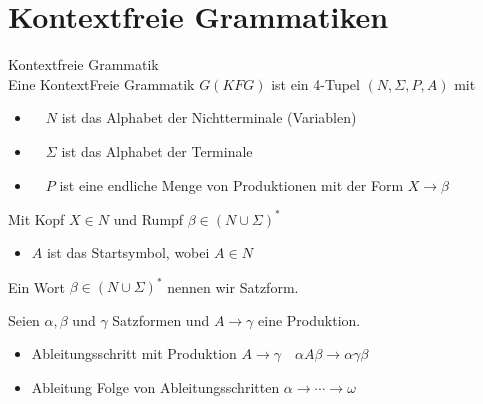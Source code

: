 \graphicspath{{images/}}
\section*{Kontextfreie Grammatiken}

\begin{definition}{Kontextfreie Grammatik}\\
    Eine KontextFreie Grammatik $G(K F G)$ ist ein 4-Tupel $(N, \Sigma, P, A)$ mit

    \begin{itemize}
    \item $\quad N$ ist das Alphabet der Nichtterminale (Variablen)
    \item $\quad \Sigma$ ist das Alphabet der Terminale
    \item $\quad P$ ist eine endliche Menge von Produktionen mit der Form $X \rightarrow \beta$
    \end{itemize}

    Mit Kopf $X \in N$ und Rumpf $\beta \in(N \cup \Sigma)^{*}$

    \begin{itemize}
    \item $A$ ist das Startsymbol, wobei $A \in N$
    \end{itemize}

    Ein Wort $\beta \in(N \cup \Sigma)^{*}$ nennen wir Satzform.

    Seien $\alpha, \beta$ und $\gamma$ Satzformen und $A \rightarrow \gamma$ eine Produktion.

    \begin{itemize}
    \item Ableitungsschritt mit Produktion $A \rightarrow \gamma \quad \alpha A \beta \rightarrow \alpha \gamma \beta$
    \item Ableitung Folge von Ableitungsschritten $\alpha \rightarrow \cdots \rightarrow \omega$
    \end{itemize}
\end{definition}

